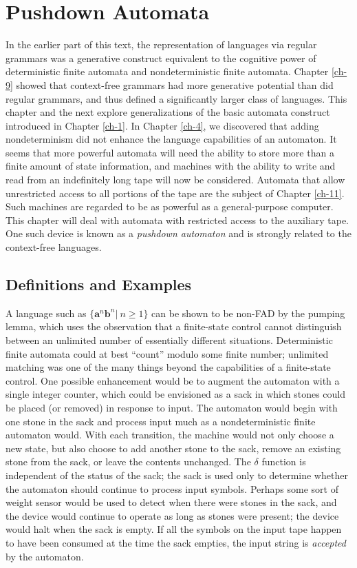 \chapter{Pushdown Automata}\label{ch-10}

In the earlier part of this text, the representation of languages via regular
grammars was a generative construct equivalent to the cognitive power of
deterministic finite automata and nondeterministic finite automata. Chapter \ref{ch-9}
showed that context-free grammars had more generative potential than did regular
grammars, and thus defined a significantly larger class of languages. This
chapter and the next explore generalizations of the basic automata construct
introduced in Chapter \ref{ch-1}. In Chapter \ref{ch-4}, we discovered that adding nondeterminism
did not enhance the language capabilities of an automaton. It seems that more
powerful automata will need the ability to store more than a finite amount of
state information, and machines with the ability to write and read from an
indefinitely long tape will now be considered. Automata that allow unrestricted
access to all portions of the tape are the subject of Chapter \ref{ch-11}. Such machines
are regarded to be as powerful as a general-purpose computer. This chapter will
deal with automata with restricted access to the auxiliary tape. One such device
is known as a \emph{pushdown automaton} and is strongly related to the
context-free languages.

\section{Definitions and Examples}\label{sec-10.1}

A language such as $\{\pmb{a}^n\pmb{b}^n|\ n \geq 1\}$ can be shown to be non-FAD
by the pumping lemma, which uses the observation that a finite-state control
cannot distinguish between an unlimited number of essentially different
situations. Deterministic finite automata could at best ``count'' modulo some
finite number; unlimited matching was one of the many things beyond the
capabilities of a finite-state control. One possible enhancement would be to
augment the automaton with a single integer counter, which could be envisioned
as a sack in which stones could be placed (or removed) in response to input. The
automaton would begin with one stone in the sack and process input much as a
nondeterministic finite automaton would. With each transition, the machine would
not only choose a new state, but also choose to add another stone to the sack,
remove an existing stone from the sack, or leave the contents unchanged. The
$\delta$ function is independent of the status of the sack; the sack is used
only to determine whether the automaton should continue to process input
symbols. Perhaps some sort of weight sensor would be used to detect when there
were stones in the sack, and the device would continue to operate as long as
stones were present; the device would halt when the sack is empty. If all the
symbols on the input tape happen to have been consumed at the time the sack
empties, the input string is \emph{accepted} by the automaton.

